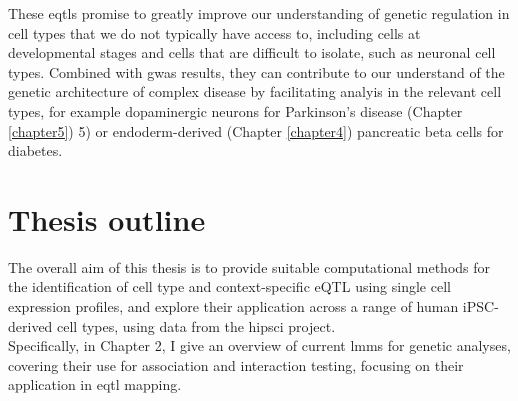 These \glspl{eqtl} promise to greatly improve our understanding of genetic regulation in cell types that we do not typically have access to, including cells at developmental stages and cells that are difficult to isolate, such as neuronal cell types.
Combined with \gls{gwas} results, they can contribute to our understand of the genetic architecture of complex disease by facilitating analyis in the relevant cell types, for example dopaminergic neurons for Parkinson's disease (Chapter
\ref{chapter5})
5)
or endoderm-derived (Chapter 
\ref{chapter4})
pancreatic beta cells for diabetes.


\newpage

\section{Thesis outline}




The overall aim of this thesis is to provide suitable computational methods for the identification of cell type and context-specific eQTL using single cell expression profiles, 
and explore their application across a range of human iPSC-derived cell types, using data from the \gls{hipsci} project.\\



Specifically, in Chapter 2, I give an overview of current \glspl{lmm} for genetic analyses, covering their use for association and interaction testing, focusing on their application in \gls{eqtl} mapping.\\

